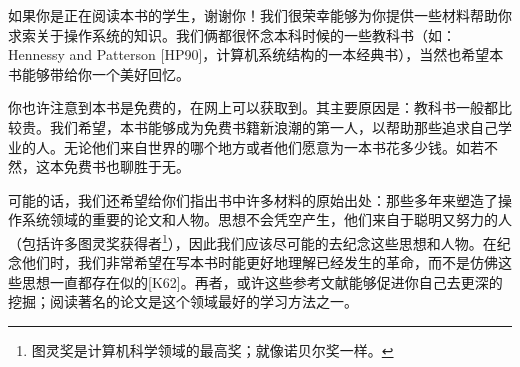  \vspace*{0.0cm}
\thispagestyle{empty}
\centerline{}\vspace{2cm}

如果你是正在阅读本书的学生，谢谢你！我们很荣幸能够为你提供一些材料帮助你求索关于操作系统的知识。我们俩都很怀念本科时候的一些教科书（如：Hennessy and Patterson [HP90]，计算机系统结构的一本经典书），当然也希望本书能够带给你一个美好回忆。

你也许注意到本书是免费的，在网上可以获取到。其主要原因是：教科书一般都比较贵。我们希望，本书能够成为免费书籍新浪潮的第一人，以帮助那些追求自己学业的人。无论他们来自世界的哪个地方或者他们愿意为一本书花多少钱。如若不然，这本免费书也聊胜于无。

可能的话，我们还希望给你们指出书中许多材料的原始出处：那些多年来塑造了操作系统领域的重要的论文和人物。思想不会凭空产生，他们来自于聪明又努力的人（包括许多图灵奖获得者\footnote{图灵奖是计算机科学领域的最高奖；就像诺贝尔奖一样。}），因此我们应该尽可能的去纪念这些思想和人物。在纪念他们时，我们非常希望在写本书时能更好地理解已经发生的革命，而不是仿佛这些思想一直都存在似的[K62]。再者，或许这些参考文献能够促进你自己去更深的挖掘；阅读著名的论文是这个领域最好的学习方法之一。


